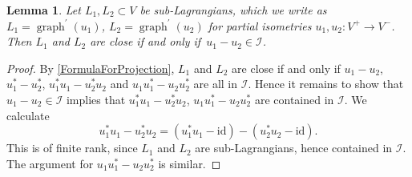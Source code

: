 \documentclass[10pt,a4paper]{amsart}
\numberwithin{equation}{section}
\newtheorem{Lemma}[Theorem]{Lemma}
\DeclareMathOperator{\graph}{\mathrm{graph}}
\newcommand{\id}{\mathrm{id}}
\begin{document}
\begin{Lemma} \label{LemmaClosenessForUnitaries}
Let $L_1, L_2 \subset V$ be sub-Lagrangians, which we write as $L_1 = \graph^\prime(u_1)$, $L_2 = \graph^\prime(u_2)$ for partial isometries $u_1, u_2\colon V^+ \to V^-$.
Then $L_1$ and $L_2$ are close if and only if~${u_1 - u_2 \in \mathcal{I}}$.
\end{Lemma}

\begin{proof}
By \eqref{FormulaForProjection}, $L_1$ and $L_2$ are close if and only if $u_1 - u_2$, $u_1^* - u_2^*$, $u_1^*u_1 - u_2^* u_2$ and $u_1 u_1^* - u_2 u_2^*$ are all in $\mathcal{I}$.
Hence it remains to show that $u_1 - u_2 \in \mathcal{I}$ implies that $u_1^*u_1 - u_2^* u_2$, $u_1 u_1^* - u_2 u_2^*$ are contained in $\mathcal{I}$.
We calculate
\begin{equation*}
u_1^* u_1 - u_2^* u_2 = (u_1^*u_1 - \id) - (u_2^* u_2 - \id).
\end{equation*}
This is of finite rank, since $L_1$ and $L_2$ are sub-Lagrangians, hence contained in $\mathcal{I}$.
The argument for $u_1 u_1^* - u_2 u_2^*$ is similar.
\end{proof}
\end{document}
